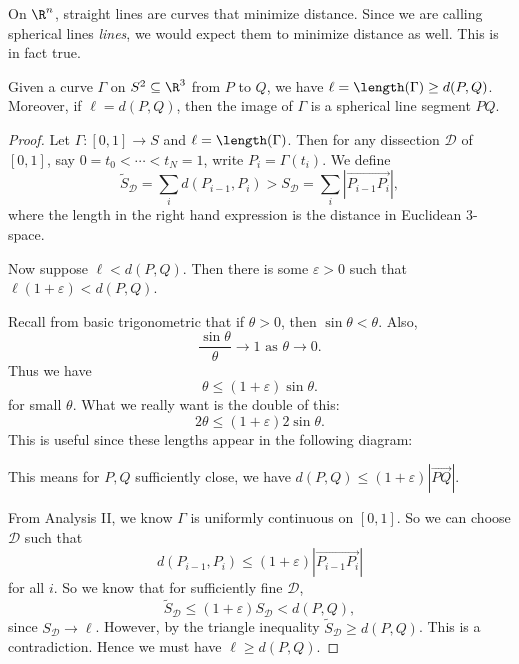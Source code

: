 \documentclass[a4paper]{article}
\begin{document}
On $\R^n$, straight lines are curves that minimize distance. Since we are calling spherical lines \emph{lines}, we would expect them to minimize distance as well. This is in fact true.
\begin{prop}
  Given a curve $\Gamma$ on $S^2 \subseteq \R^3$ from $P$ to $Q$, we have $\ell = \length(\Gamma) \geq d(P, Q)$. Moreover, if $\ell = d(P, Q)$, then the image of $\Gamma$ is a spherical line segment $PQ$.
\end{prop}

\begin{proof}
  Let $\Gamma: [0, 1] \to S$ and $\ell = \length(\Gamma)$. Then for any dissection $\mathcal{D}$ of $[0, 1]$, say $0 = t_0 < \cdots < t_N = 1$, write $P_i = \Gamma(t_i)$. We define
  \[
    \tilde{S}_{\mathcal{D}} = \sum_i d(P_{i - 1}, P_i) > S_{\mathcal{D}} = \sum_i |\overrightarrow{P_{i - 1}P_i}|,
  \]
  where the length in the right hand expression is the distance in Euclidean $3$-space.

  Now suppose $\ell < d(P, Q)$. Then there is some $\varepsilon > 0$ such that $\ell(1 + \varepsilon) < d(P, Q)$.

  Recall from basic trigonometric that if $\theta > 0$, then $\sin \theta < \theta$. Also,
  \[
    \frac{\sin \theta}{\theta} \to 1\text{ as }\theta \to 0.
  \]
  Thus we have
  \[
    \theta \leq (1 + \varepsilon) \sin \theta.
  \]
  for small $\theta$. What we really want is the double of this:
  \[
    2\theta \leq (1 + \varepsilon) 2\sin \theta.
  \]
  This is useful since these lengths appear in the following diagram:
  \begin{center}
  \end{center}
  This means for $P, Q$ sufficiently close, we have $d(P, Q) \leq (1 + \varepsilon) |\overrightarrow{PQ}|$.

  From Analysis II, we know $\Gamma$ is uniformly continuous on $[0, 1]$. So we can choose $\mathcal{D}$ such that
  \[
    d(P_{i - 1}, P_i) \leq (1 + \varepsilon)|\overrightarrow{P_{i - 1}P_i}|
  \]
  for all $i$. So we know that for sufficiently fine $\mathcal{D}$,
  \[
    \tilde{S}_{\mathcal{D}} \leq (1 + \varepsilon) S_\mathcal{D} < d(P, Q),
  \]
  since $S_\mathcal{D} \to \ell$. However, by the triangle inequality $\tilde{S}_\mathcal{D} \geq d(P, Q)$. This is a contradiction. Hence we must have $\ell \geq d(P, Q)$.


\end{proof}
\end{document}
